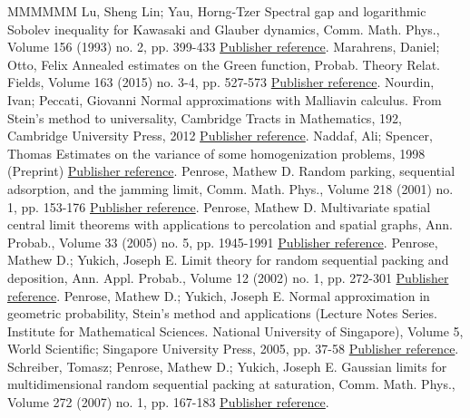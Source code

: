 \documentclass[11pt]{article}
\theoremstyle{definition}
\numberwithin{equation}{section}
\numberwithin{figure}{section}
\numberwithin{table}{section}
\begin{document}
\begin{thebibliography}{MMMMMM}
 Lu, Sheng Lin; Yau, Horng-Tzer Spectral gap and logarithmic Sobolev inequality for Kawasaki and Glauber dynamics, Comm. Math. Phys., Volume 156 (1993) no. 2, pp. 399-433 \href{https://ahl.centre-mersenne.org/item/AHL_2020__3__825_0/#Lu-Yau-93}{Publisher reference}.
 Marahrens, Daniel; Otto, Felix Annealed estimates on the Green function, Probab. Theory Relat. Fields, Volume 163 (2015) no. 3-4, pp. 527-573 \href{https://ahl.centre-mersenne.org/item/AHL_2020__3__825_0/#Marahrens-Otto-15}{Publisher reference}.
 Nourdin, Ivan; Peccati, Giovanni Normal approximations with Malliavin calculus. From Stein’s method to universality, Cambridge Tracts in Mathematics, 192, Cambridge University Press, 2012 \href{https://ahl.centre-mersenne.org/item/AHL_2020__3__825_0/#Nourdin-Peccati-12}{Publisher reference}.
 Naddaf, Ali; Spencer, Thomas Estimates on the variance of some homogenization problems, 1998 (Preprint) \href{https://ahl.centre-mersenne.org/item/AHL_2020__3__825_0/#Naddaf-Spencer-98}{Publisher reference}.
 Penrose, Mathew D. Random parking, sequential adsorption, and the jamming limit, Comm. Math. Phys., Volume 218 (2001) no. 1, pp. 153-176 \href{https://ahl.centre-mersenne.org/item/AHL_2020__3__825_0/#Penrose-01}{Publisher reference}.
 Penrose, Mathew D. Multivariate spatial central limit theorems with applications to percolation and spatial graphs, Ann. Probab., Volume 33 (2005) no. 5, pp. 1945-1991 \href{https://ahl.centre-mersenne.org/item/AHL_2020__3__825_0/#Penrose-05}{Publisher reference}.
 Penrose, Mathew D.; Yukich, Joseph E. Limit theory for random sequential packing and deposition, Ann. Appl. Probab., Volume 12 (2002) no. 1, pp. 272-301 \href{https://ahl.centre-mersenne.org/item/AHL_2020__3__825_0/#Penrose-Yukich-02}{Publisher reference}.
 Penrose, Mathew D.; Yukich, Joseph E. Normal approximation in geometric probability, Stein’s method and applications (Lecture Notes Series. Institute for Mathematical Sciences. National University of Singapore), Volume 5, World Scientific; Singapore University Press, 2005, pp. 37-58 \href{https://ahl.centre-mersenne.org/item/AHL_2020__3__825_0/#PY-05}{Publisher reference}.
 Schreiber, Tomasz; Penrose, Mathew D.; Yukich, Joseph E. Gaussian limits for multidimensional random sequential packing at saturation, Comm. Math. Phys., Volume 272 (2007) no. 1, pp. 167-183 \href{https://ahl.centre-mersenne.org/item/AHL_2020__3__825_0/#Schreiber-Penrose-Yukich-07}{Publisher reference}.

\end{thebibliography}
\end{document}
